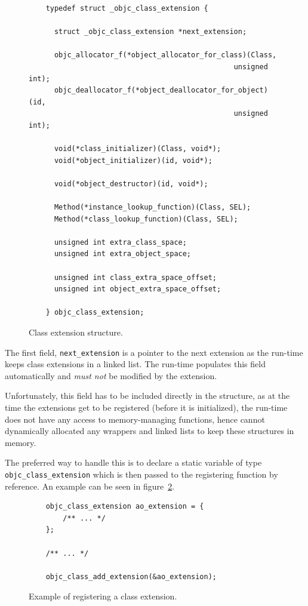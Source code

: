 \begin{figure}[H] 
  \begin{verbatim}
    typedef struct _objc_class_extension {

      struct _objc_class_extension *next_extension;
      
      objc_allocator_f(*object_allocator_for_class)(Class,
                                                unsigned int);
      objc_deallocator_f(*object_deallocator_for_object)(id,
                                                unsigned int);
      
      void(*class_initializer)(Class, void*);
      void(*object_initializer)(id, void*);
      
      void(*object_destructor)(id, void*);
        
      Method(*instance_lookup_function)(Class, SEL);
      Method(*class_lookup_function)(Class, SEL);
      
      unsigned int extra_class_space;
      unsigned int extra_object_space;
      
      unsigned int class_extra_space_offset;
      unsigned int object_extra_space_offset;
      
    } objc_class_extension;
  \end{verbatim}
  \centering{}
  \caption{Class extension structure.}
  \label{fig:class_ext_struct}
\end{figure}

The first field, \verb=next_extension= is a pointer to the next extension as the run-time keeps class extensions in a linked list. The run-time populates this field automatically and \emph{must not} be modified by the extension. 

Unfortunately, this field has to be included directly in the structure, as at the time the extensions get to be registered (before it is initialized), the run-time does not have any access to memory-managing functions, hence cannot dynamically allocated any wrappers and linked lists to keep these structures in memory.

The preferred way to handle this is to declare a static variable of type \newline{}\verb=objc_class_extension= which is then passed to the registering function by reference. An example can be seen in figure~\ref{fig:class_ext_struct_example}.

\begin{figure}[H] 
  \begin{verbatim}
    objc_class_extension ao_extension = { 
        /** ... */ 
    };
    
    /** ... */
    
    objc_class_add_extension(&ao_extension);
  \end{verbatim}
  \centering{}
  \caption{Example of registering a class extension.}
  \label{fig:class_ext_struct_example}
\end{figure}


